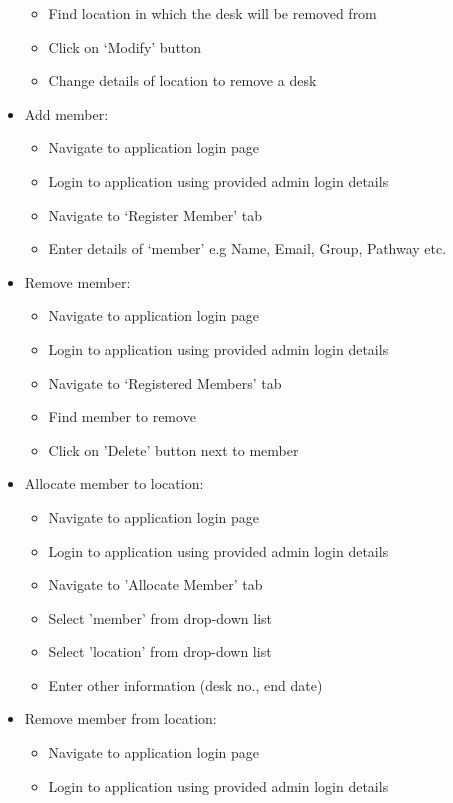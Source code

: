 \documentclass[11pt,a4paper]{article}
\begin{document}
\begin{itemize}
\begin{itemize}
      \item Find location in which the desk will be removed from
      \item Click on ‘Modify’ button
      \item Change details of location to remove a desk
    \end{itemize}
\newpage
  \item Add member:
    \begin{itemize}
      \item Navigate to application login page
      \item Login to application using provided admin login details
      \item Navigate to ‘Register Member’ tab
      \item Enter details of ‘member’ e.g Name, Email, Group, Pathway etc.
    \end{itemize}
  \item Remove member:
    \begin{itemize}
      \item Navigate to application login page
      \item Login to application using provided admin login details
      \item Navigate to ‘Registered Members' tab
      \item Find member to remove
      \item Click on 'Delete' button next to member
    \end{itemize}
  \item Allocate member to location:
    \begin{itemize}
        \item Navigate to application login page
        \item Login to application using provided admin login details
        \item Navigate to 'Allocate Member' tab
        \item Select 'member' from drop-down list
        \item Select 'location' from drop-down list
        \item Enter other information (desk no., end date)
    \end{itemize}
  \item Remove member from location:
    \begin{itemize}
        \item Navigate to application login page
        \item Login to application using provided admin login details

\end{itemize}
\end{itemize}
\end{document}
